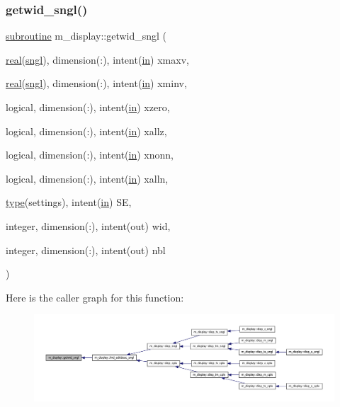 \subsubsection{\texorpdfstring{getwid\+\_\+sngl()}{getwid\_sngl()}}
{\footnotesize\ttfamily \hyperlink{M__stopwatch_83_8txt_acfbcff50169d691ff02d4a123ed70482}{subroutine} m\+\_\+display\+::getwid\+\_\+sngl (\begin{DoxyParamCaption}\item[{\hyperlink{read__watch_83_8txt_abdb62bde002f38ef75f810d3a905a823}{real}(\hyperlink{namespacem__display_a2ac86bc535c3ccc5947dbb3109c666b5}{sngl}), dimension(\+:), intent(\hyperlink{M__journal_83_8txt_afce72651d1eed785a2132bee863b2f38}{in})}]{xmaxv,  }\item[{\hyperlink{read__watch_83_8txt_abdb62bde002f38ef75f810d3a905a823}{real}(\hyperlink{namespacem__display_a2ac86bc535c3ccc5947dbb3109c666b5}{sngl}), dimension(\+:), intent(\hyperlink{M__journal_83_8txt_afce72651d1eed785a2132bee863b2f38}{in})}]{xminv,  }\item[{logical, dimension(\+:), intent(\hyperlink{M__journal_83_8txt_afce72651d1eed785a2132bee863b2f38}{in})}]{xzero,  }\item[{logical, dimension(\+:), intent(\hyperlink{M__journal_83_8txt_afce72651d1eed785a2132bee863b2f38}{in})}]{xallz,  }\item[{logical, dimension(\+:), intent(\hyperlink{M__journal_83_8txt_afce72651d1eed785a2132bee863b2f38}{in})}]{xnonn,  }\item[{logical, dimension(\+:), intent(\hyperlink{M__journal_83_8txt_afce72651d1eed785a2132bee863b2f38}{in})}]{xalln,  }\item[{\hyperlink{stop__watch_83_8txt_a70f0ead91c32e25323c03265aa302c1c}{type}(settings), intent(\hyperlink{M__journal_83_8txt_afce72651d1eed785a2132bee863b2f38}{in})}]{SE,  }\item[{integer, dimension(\+:), intent(out)}]{wid,  }\item[{integer, dimension(\+:), intent(out)}]{nbl }\end{DoxyParamCaption})\hspace{0.3cm}{\ttfamily [private]}}

Here is the caller graph for this function\+:
\nopagebreak
\begin{figure}[H]
\begin{center}
\leavevmode
\includegraphics[width=350pt]{namespacem__display_a033e94ba8986246bbf567046e8678163_icgraph}
\end{center}
\end{figure}
\mbox{\label{namespacem__display_a803611d2a793f2a4aa7563b6c8295cb3}} 
